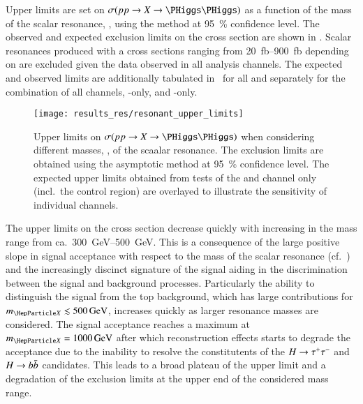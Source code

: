 Upper limits are set on $\sigma(pp \to X \to \HH)$ as a function of
the mass of the scalar resonance, \mX, using the \CLs method at
\SI{95}{\percent} confidence level. The observed and expected
exclusion limits on the cross section are shown in
. Scalar resonances produced with a cross
sections ranging from \SIrange{20}{900}{\femto\barn} depending on \mX
are excluded given the data observed in all analysis channels. The
expected and observed limits are additionally tabulated
in~ for all \mX and separately for the
combination of all channels, \lephad-only, and \hadhad-only.

\begin{figure}[htbp]
  \centering

  \texttt{[image: results\_res/resonant\_upper\_limits]}

  \caption{Upper limits on $\sigma(pp \to X \to \HH)$ when considering
    different masses, \mX, of the scaalar resonance. The exclusion
    limits are obtained using the asymptotic \CLs method at
    \SI{95}{\percent} confidence level. The expected upper limits
    obtained from tests of the \lephad and \hadhad channel only
    (incl.\ the control region) are overlayed to illustrate the
    sensitivity of individual channels.}%
  \label{fig:res_upper_limits}
\end{figure}

The upper limits on the cross section decrease quickly with increasing
\mX in the mass range from ca.\ \SIrange{300}{500}{\GeV}. This is a
consequence of the large positive slope in signal acceptance with
respect to the mass of the scalar resonance
(cf.~) and the increasingly
discinct signature of the signal aiding in the discrimination between
the signal and background processes. Particularly the ability to
distinguish the signal from the top background, which has large
contributions for $\mX \lesssim \SI{500}{\GeV}$, increases quickly as larger resonance masses
are considered. The signal acceptance reaches a maximum at
$\mX = \SI{1000}{\GeV}$ after which reconstruction effects starts to
degrade the acceptance due to the inability to resolve the
constitutents of the $H \to \tau^{+} \tau^{-}$ and $H \to b\bar{b}$
candidates. This leads to a broad plateau of the upper limit and a
degradation of the exclusion limits at the upper end of the considered
mass range.

